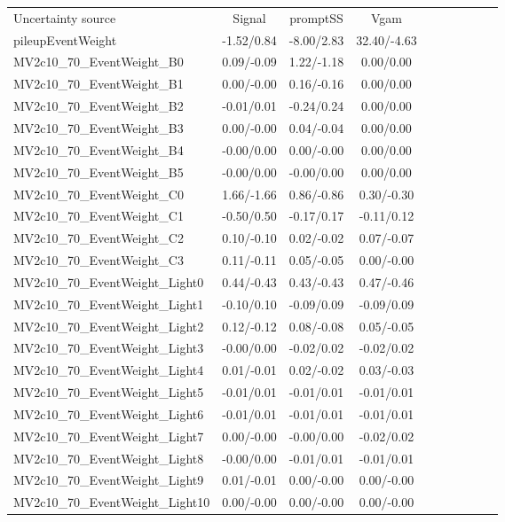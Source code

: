 \begin{table}[h]
\scriptsize
\begin{center}
\begin{tabular}{l|ccccccccc}
\hline
\hline
Uncertainty source &Signal &promptSS &Vgam \\
pileupEventWeight &-1.52/0.84 &-8.00/2.83 &32.40/-4.63 \\
MV2c10\_70\_EventWeight\_B0 &0.09/-0.09 &1.22/-1.18 &0.00/0.00 \\
MV2c10\_70\_EventWeight\_B1 &0.00/-0.00 &0.16/-0.16 &0.00/0.00 \\
MV2c10\_70\_EventWeight\_B2 &-0.01/0.01 &-0.24/0.24 &0.00/0.00 \\
MV2c10\_70\_EventWeight\_B3 &0.00/-0.00 &0.04/-0.04 &0.00/0.00 \\
MV2c10\_70\_EventWeight\_B4 &-0.00/0.00 &0.00/-0.00 &0.00/0.00 \\
MV2c10\_70\_EventWeight\_B5 &-0.00/0.00 &-0.00/0.00 &0.00/0.00 \\
MV2c10\_70\_EventWeight\_C0 &1.66/-1.66 &0.86/-0.86 &0.30/-0.30 \\
MV2c10\_70\_EventWeight\_C1 &-0.50/0.50 &-0.17/0.17 &-0.11/0.12 \\
MV2c10\_70\_EventWeight\_C2 &0.10/-0.10 &0.02/-0.02 &0.07/-0.07 \\
MV2c10\_70\_EventWeight\_C3 &0.11/-0.11 &0.05/-0.05 &0.00/-0.00 \\
MV2c10\_70\_EventWeight\_Light0 &0.44/-0.43 &0.43/-0.43 &0.47/-0.46 \\
MV2c10\_70\_EventWeight\_Light1 &-0.10/0.10 &-0.09/0.09 &-0.09/0.09 \\
MV2c10\_70\_EventWeight\_Light2 &0.12/-0.12 &0.08/-0.08 &0.05/-0.05 \\
MV2c10\_70\_EventWeight\_Light3 &-0.00/0.00 &-0.02/0.02 &-0.02/0.02 \\
MV2c10\_70\_EventWeight\_Light4 &0.01/-0.01 &0.02/-0.02 &0.03/-0.03 \\
MV2c10\_70\_EventWeight\_Light5 &-0.01/0.01 &-0.01/0.01 &-0.01/0.01 \\
MV2c10\_70\_EventWeight\_Light6 &-0.01/0.01 &-0.01/0.01 &-0.01/0.01 \\
MV2c10\_70\_EventWeight\_Light7 &0.00/-0.00 &-0.00/0.00 &-0.02/0.02 \\
MV2c10\_70\_EventWeight\_Light8 &-0.00/0.00 &-0.01/0.01 &-0.01/0.01 \\
MV2c10\_70\_EventWeight\_Light9 &0.01/-0.01 &0.00/-0.00 &0.00/-0.00 \\
MV2c10\_70\_EventWeight\_Light10 &0.00/-0.00 &0.00/-0.00 &0.00/-0.00 \\

\end{tabular}
\end{center}
\end{table}
